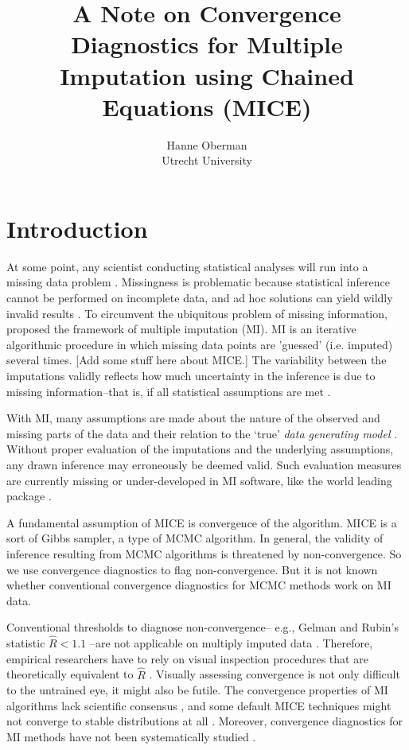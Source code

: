 \documentclass[article]{jss}
\author{Hanne Oberman\\Utrecht University}
\title{A Note on Convergence Diagnostics for Multiple Imputation using Chained Equations (MICE)}
\begin{document}

\section{Introduction} \label{sec:intro} %

At some point, any scientist conducting statistical analyses will run into a missing data problem \citep{alli02}. Missingness is problematic because statistical inference cannot be performed on incomplete data, and ad hoc solutions can yield wildly invalid results \citep{buur18}. To circumvent the ubiquitous problem of missing information, \cite{rubin87} proposed the framework of multiple imputation (MI). MI is an iterative algorithmic procedure in which missing data points are 'guessed' (i.e. imputed) several times. [Add some stuff here about MICE.] The variability between the imputations validly reflects how much uncertainty in the inference is due to missing information--that is, if all statistical assumptions are met \cite{rubin87}.

With MI, many assumptions are made about the nature of the observed and missing parts of the data and their relation to the `true' \emph{data generating model} \citep{buur18}. Without proper evaluation of the imputations and the underlying assumptions, any drawn inference may erroneously be deemed valid. Such evaluation measures are currently missing or under-developed in MI software, like the world leading  package  \citep{mice}. %

A fundamental assumption of MICE is convergence of the algorithm. MICE is a sort of Gibbs sampler, a type of MCMC algorithm. In general, the validity of inference resulting from MCMC algorithms is threatened by non-convergence. So we use convergence diagnostics to flag non-convergence. But it is not known whether conventional convergence diagnostics for MCMC methods work on MI data. 

Conventional thresholds to diagnose non-convergence-- e.g., Gelman and Rubin's \citeyear{gelm92} statistic $\widehat{R} < 1.1$ --are not applicable on multiply imputed data \citep{lace07}. Therefore, empirical researchers have to rely on visual inspection procedures that are theoretically equivalent to $\widehat{R}$ \citep{whit11}. Visually assessing convergence is not only difficult to the untrained eye, it might also be futile. The convergence properties of MI algorithms lack scientific consensus \citep{taka17}, and some default MICE techniques might not converge to stable distributions at all \citep{murr18}. Moreover, convergence diagnostics for MI methods have not been systematically studied \citep{buur18}.
\end{document}
